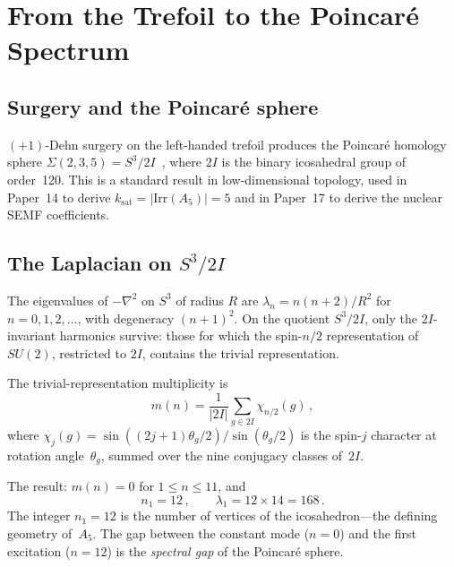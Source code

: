 \documentclass[11pt]{article}
\begin{document}
\section{From the Trefoil to the Poincar\'e Spectrum}
\label{sec:spectrum}

\subsection{Surgery and the Poincar\'e sphere}

$(+1)$-Dehn surgery on the left-handed trefoil produces the
Poincar\'e homology sphere
$\Sigma(2,3,5) = S^3/2I$~\cite{Rolfsen}, where $2I$ is the
binary icosahedral group of order~120.  This is a standard
result in low-dimensional topology, used in Paper~14 to
derive $k_\text{sat} = |\mathrm{Irr}(A_5)| = 5$ and in
Paper~17 to derive the nuclear SEMF coefficients.

\subsection{The Laplacian on $S^3/2I$}

The eigenvalues of $-\nabla^2$ on $S^3$ of radius $R$ are
$\lambda_n = n(n+2)/R^2$ for $n = 0, 1, 2, \ldots$, with
degeneracy $(n+1)^2$.  On the quotient $S^3/2I$, only the
$2I$-invariant harmonics survive: those for which the
spin-$n/2$ representation of $SU(2)$, restricted to $2I$,
contains the trivial representation.

The trivial-representation multiplicity is
\begin{equation}
  m(n) = \frac{1}{|2I|}\sum_{g \in 2I} \chi_{n/2}(g)\,,
\end{equation}
where $\chi_j(g) = \sin((2j{+}1)\theta_g/2)/\sin(\theta_g/2)$
is the spin-$j$ character at rotation angle~$\theta_g$, summed
over the nine conjugacy classes of~$2I$.

The result: $m(n) = 0$ for $1 \leq n \leq 11$, and
\begin{equation}
\label{eq:lambda1}
\boxed{
  n_1 = 12\,,\qquad
  \lambda_1 = 12 \times 14 = 168\,.
}
\end{equation}
The integer $n_1 = 12$ is the number of vertices of the
icosahedron---the defining geometry of~$A_5$.  The gap between
the constant mode ($n = 0$) and the first excitation ($n = 12$)
is the \emph{spectral gap} of the Poincar\'e sphere.
\end{document}
